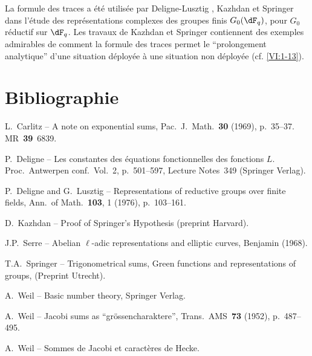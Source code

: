 La formule des traces a été utilisée par Deligne-Lusztig \cite{dl76}, 
Kazhdan \cite{ka77} et Springer \cite{sp76} dans l'étude des 
représentations complexes des groupes finis $G_0(\dF_q)$, pour $G_0$ 
réductif sur $\dF_q$. Les travaux de Kazhdan et Springer contiennent des 
exemples admirables de comment la formule des traces permet le ``prolongement 
analytique'' d'une situation déployée à une situation non déployée 
(cf. \ref{VI:1-13}). 







\section*{Bibliographie}
\begin{enumerate}[{[}1{]}]
\item L.~Carlitz -- A note on exponential sums, Pac.~J.~Math.~\textbf{30} (1969), p.~35--37. MR~\textbf{39}~6839.
\item P.~Deligne -- Les constantes des équations fonctionnelles des fonctions $L$.
Proc.~Antwerpen conf.~Vol.~2, p.~501--597, Lecture Notes~349 (Springer Verlag).
\item P.~Deligne and G.~Lusztig -- Representations of reductive groups over finite fields,
Ann.~of Math.~\textbf{103}, 1 (1976), p.~103--161.
\item D.~Kazhdan -- Proof of Springer's Hypothesis (preprint Harvard).
\item J.P.~Serre -- Abelian $\ell$-adic representations and elliptic curves, Benjamin (1968).
\item T.A.~Springer -- Trigonometrical sums, Green functions and representations of
 groups, (Preprint Utrecht).
\item A.~Weil -- Basic number theory, Springer Verlag.
\item A.~Weil -- Jacobi sums as ``gr\"ossencharaktere'', Trans.~AMS~\textbf{73} (1952), p.~487--495.
\item A.~Weil -- Sommes de Jacobi et caractères de Hecke.
\end{enumerate}
